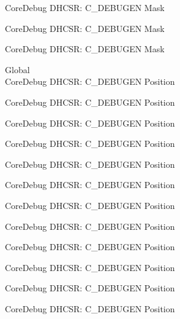 \begin{DoxyRefList}
\label{deprecated__deprecated001080}%
%
Core\+Debug DHCSR\+: C\+\_\+\+DEBUGEN Mask 

\label{deprecated__deprecated001169}%
%
Core\+Debug DHCSR\+: C\+\_\+\+DEBUGEN Mask 

\label{deprecated__deprecated001271}%
%
Core\+Debug DHCSR\+: C\+\_\+\+DEBUGEN Mask  
\item[Global \doxylink{group___c_m_s_i_s___core_debug_gab557abb5b172b74d2cf44efb9d824e4e}{Core\+Debug\+\_\+\+DHCSR\+\_\+\+C\+\_\+\+DEBUGEN\+\_\+\+Pos} ]\hfill \\
\label{deprecated__deprecated000039}%
%
Core\+Debug DHCSR\+: C\+\_\+\+DEBUGEN Position 

\label{deprecated__deprecated000127}%
%
Core\+Debug DHCSR\+: C\+\_\+\+DEBUGEN Position 

\label{deprecated__deprecated000183}%
%
Core\+Debug DHCSR\+: C\+\_\+\+DEBUGEN Position 

\label{deprecated__deprecated000266}%
%
Core\+Debug DHCSR\+: C\+\_\+\+DEBUGEN Position 

\label{deprecated__deprecated000325}%
%
Core\+Debug DHCSR\+: C\+\_\+\+DEBUGEN Position 

\label{deprecated__deprecated000401}%
%
Core\+Debug DHCSR\+: C\+\_\+\+DEBUGEN Position 

\label{deprecated__deprecated000490}%
%
Core\+Debug DHCSR\+: C\+\_\+\+DEBUGEN Position 

\label{deprecated__deprecated000592}%
%
Core\+Debug DHCSR\+: C\+\_\+\+DEBUGEN Position 

\label{deprecated__deprecated000717}%
%
Core\+Debug DHCSR\+: C\+\_\+\+DEBUGEN Position 

\label{deprecated__deprecated000805}%
%
Core\+Debug DHCSR\+: C\+\_\+\+DEBUGEN Position 

\label{deprecated__deprecated000861}%
%
Core\+Debug DHCSR\+: C\+\_\+\+DEBUGEN Position 

\label{deprecated__deprecated000944}%
%
Core\+Debug DHCSR\+: C\+\_\+\+DEBUGEN Position 


\end{DoxyRefList}
